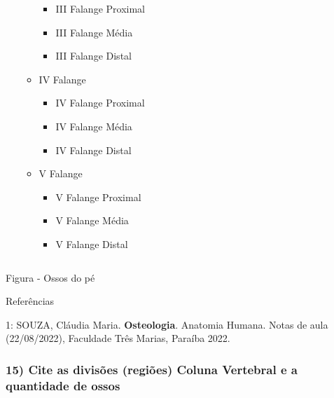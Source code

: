 \documentclass[
]{book}
\providecommand{\tightlist}{%
  \setlength{\itemsep}{0pt}\setlength{\parskip}{0pt}}
\begin{document}
\begin{itemize}
\begin{itemize}
    \begin{itemize}
    \tightlist
    \item
      III Falange Proximal
    \item
      III Falange Média
    \item
      III Falange Distal
    \end{itemize}
  \item
    IV Falange

    \begin{itemize}
    \tightlist
    \item
      IV Falange Proximal
    \item
      IV Falange Média
    \item
      IV Falange Distal
    \end{itemize}
  \item
    V Falange

    \begin{itemize}
    \tightlist
    \item
      V Falange Proximal
    \item
      V Falange Média
    \item
      V Falange Distal
    \end{itemize}
  \end{itemize}
\end{itemize}

\begin{longtable}[]{@{}
  >{\raggedright\arraybackslash}p{}
  >{\raggedright\arraybackslash}p{}@{}}
\toprule()
\endhead
& \\
\bottomrule()
\end{longtable}

Figura - Ossos do pé

Referências

1: SOUZA, Cláudia Maria. \textbf{Osteologia}. Anatomia Humana. Notas de aula (22/08/2022), Faculdade Três Marias, Paraíba 2022.

\hypertarget{cite-as-divisuxf5es-regiuxf5es-coluna-vertebral-e-a-quantidade-de-ossos}{%
\subsubsection*{15) Cite as divisões (regiões) Coluna Vertebral e a quantidade de ossos}\label{cite-as-divisuxf5es-regiuxf5es-coluna-vertebral-e-a-quantidade-de-ossos}}
\end{document}
